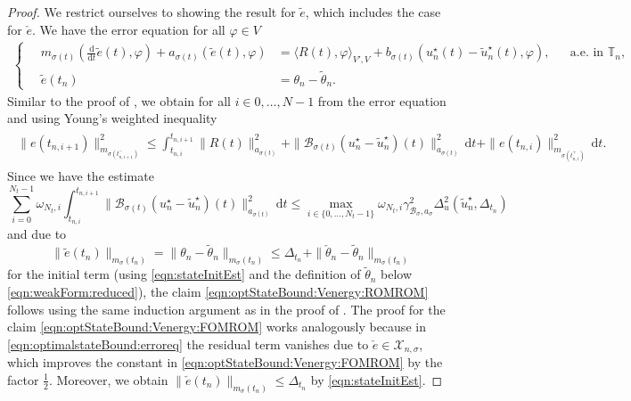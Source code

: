 \documentclass[reqno]{amsart}
\newcommand{\X}{{\mathscr X}}
\newcommand{\timeInt}{\mathbb{T}}
\newcommand{\state}{\theta}
\newcommand{\inpVar}{u}
\newcommand{\dt}{\,\mathrm{d}t}
\newcommand{\ddt}{\tfrac{\mathrm{d}}{\mathrm{d}t}}
\newcommand{\bOper}{\calB}
\newcommand{\initBound}{\initBoundn{n}}%
\newcommand{\initBoundn}[1]{\Delta_{t_{#1}}}
\newcommand{\intermediateInitState}{\intermediateState_n}%
\newcommand{\optInpVar}[1]{\inpVar_{#1}^\star}
\newcommand{\optInpVarN}{\optInpVar{n}}
\newcommand{\switch}{\sigma}
\newcommand{\nrSwitches}{N}
\newcommand{\reduce}[1]{\tilde{#1}}
\newcommand{\err}{e}
\newcommand{\intermediateErr}{\check \err}
\newcommand{\redErr}{\reduce \err}
\newcommand{\stateRed}{\reduce{\state}}
\newcommand{\optInpVarRed}[1]{\reduce{\inpVar}_{#1}^\star}
\newcommand{\optInpVarRedN}{\optInpVarRed{n}}
\newcommand{\intermediateState}{\check{\state}}
\newcommand{\calB}{\mathcal{B}}
\begin{document}
%
\begin{proof}
    We restrict ourselves to showing the result for $\redErr$, which includes the case for $\intermediateErr$. We have the error equation for all $\varphi\in V$
    \begin{align}\label{eqn:optimalstateBound:erroreq}
		\left\{\quad
    	\begin{aligned}
        	m_{\switch(t)}(\ddt \redErr(t),\varphi) + a_{\switch(t)}( \redErr(t),\varphi) &= \langle R(t), \varphi\rangle_{V',V} + b_{\switch(t)}(\optInpVarN(t)-\optInpVarRedN(t), \varphi),&& \text{a.e.~in $\timeInt_n$},\\ 
       		\redErr(t_n) &= \state_n - \stateRed_n.
    \end{aligned}\right.
	\end{align}
    Similar to the proof of , we obtain for all $i\in 0,\ldots,N-1$ from the error equation
    and using Young's weighted inequality
    \begin{align}\nonumber
    \begin{aligned}
       \|e(t_{n,i+1})\|_{m_{\switch(t^{-}_{n,i+1})}}^2  
       \leq \int_{t_{n,i}}^{t_{n,i+1}} \|R(t)\|^2_{{a_{\switch(t)}}}+\|\bOper_{\switch(t)}(\optInpVarN-\optInpVarRedN)(t)\|^2_{{a_{\switch(t)}}} \dt + \|e(t_{n,i})\|_{m_{\switch(t^{+}_{n,i})}}^2\dt.
    \end{aligned}
    \end{align}
    Since we have the estimate
    \begin{equation}\nonumber 
        \sum\limits_{i=0}^{ \nrSwitches_t-1}\omega_{ \nrSwitches_t,i}\int_{t_{n,i}}^{t_{n,i+1}}\|\bOper_{\switch(t)}(\optInpVarN-\optInpVarRedN)(t)\|^2_{{a_{\switch(t)}}} \dt\leq \max_{i\in\{0,\ldots,N_t-1\}}\omega_{\nrSwitches_t,i}\gamma_{\bOper_{\switch},{a}_{\switch}}^2 \Delta^2_u(\optInpVarRedN, \initBound)
    \end{equation}
    and due to 
    \begin{equation}\nonumber 
       \|\redErr(t_n)\|_{m_\switch(t_n)}= \|\state_n-\stateRed_n\|_{m_\switch(t_n)}\leq \initBound+\|\intermediateInitState-\stateRed_n\|_{m_\switch(t_n)}
    \end{equation}
    for the initial term (using \eqref{eqn:stateInitEst} and the definition of $\stateRed_n$ below \eqref{eqn:weakForm:reduced}), the claim \eqref{eqn:optStateBound:Venergy:ROMROM} follows using the same induction argument as in the proof of . The proof for the claim \eqref{eqn:optStateBound:Venergy:FOMROM} works analogously because in \eqref{eqn:optimalstateBound:erroreq} the residual term vanishes due to $\intermediateErr\in \X_{n,\switch}$, which improves the constant in \eqref{eqn:optStateBound:Venergy:FOMROM} by the factor $\tfrac{1}{2}$. Moreover, we obtain $ \|\intermediateErr(t_n)\|_{m_\switch(t_n)}\leq \initBound$ by \eqref{eqn:stateInitEst}.
\end{proof}
%
\end{document}
